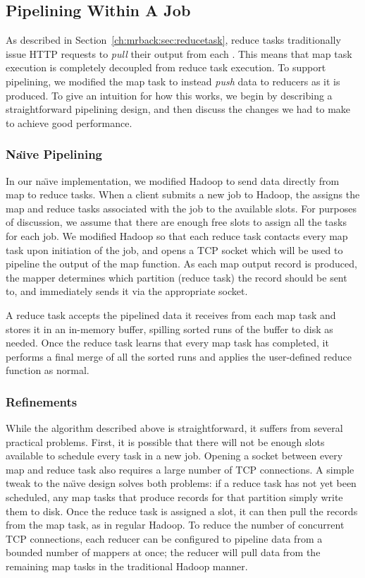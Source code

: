 \subsection{Pipelining Within A Job}
\label{ch:hop:sec:intra-pipe}
As described in Section~\ref{ch:mrback:sec:reducetask}, reduce tasks
traditionally issue HTTP requests to \emph{pull} their output from
each {\TT}. This means that map task execution is completely decoupled
from reduce task execution. To support pipelining, we modified the map
task to instead \emph{push} data to reducers as it is produced. To
give an intuition for how this works, we begin by describing a
straightforward pipelining design, and then discuss the changes we
had to make to achieve good performance.

\subsubsection{Na\"{\i}ve Pipelining}
\label{ch:hop:sec:naive}
In our na\"{\i}ve implementation, we modified Hadoop to send data directly from
map to reduce tasks. When a client submits a new job to Hadoop, the {\JT}
assigns the map and reduce tasks associated with the job to the available {\TT}
slots. For purposes of discussion, we assume that there are enough free slots to
assign all the tasks for each job. We modified Hadoop so that each reduce task
contacts every map task upon initiation of the job, and opens a TCP socket which
will be used to pipeline the output of the map function. As each map output
record is produced, the mapper determines which partition (reduce task) the
record should be sent to, and immediately sends it via the appropriate socket.

A reduce task accepts the pipelined data it receives from each map task and
stores it in an in-memory buffer, spilling sorted runs of the buffer to disk as
needed. Once the reduce task learns that every map task has completed, it
performs a final merge of all the sorted runs and applies the user-defined
reduce function as normal.

\subsubsection{Refinements}
\label{ch:hop:sec:pipe-refine}
While the algorithm described above is straightforward, it suffers
from several practical problems. First, it is possible that there will
not be enough slots available to schedule every task in a new
job. Opening a socket between every map and reduce task also requires
a large number of TCP connections. A simple tweak to the na\"{\i}ve
design solves both problems: if a reduce task has not yet been
scheduled, any map tasks that produce records for that partition
simply write them to disk. Once the reduce task is assigned a slot, it
can then pull the records from the map task, as in regular Hadoop.  To
reduce the number of concurrent TCP connections, each reducer can be
configured to pipeline data from a bounded number of mappers at once; the
reducer will pull data from the remaining map tasks in the traditional
Hadoop manner.

